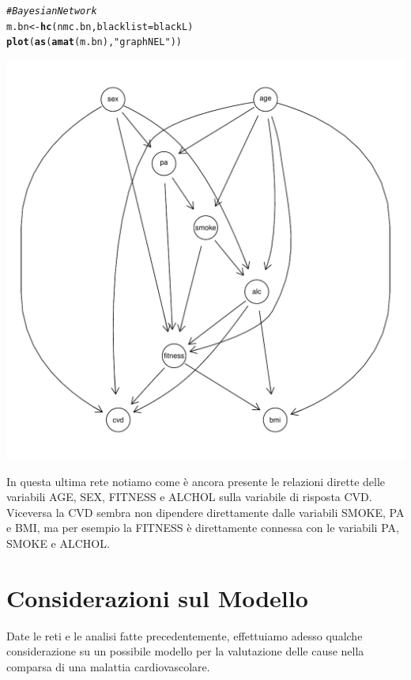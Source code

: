 \documentclass{article}\usepackage[]{graphicx}\usepackage[]{xcolor}
\makeatletter
\def\maxwidth{ %
  \ifdim\Gin@nat@width>\linewidth
    \linewidth
  \else
    \Gin@nat@width
  \fi
}
\newcommand{\hlstr}[1]{\textcolor[rgb]{0.192,0.494,0.8}{#1}}%
\newcommand{\hlcom}[1]{\textcolor[rgb]{0.678,0.584,0.686}{\textit{#1}}}%
\newcommand{\hlstd}[1]{\textcolor[rgb]{0.345,0.345,0.345}{#1}}%
\newcommand{\hlkwb}[1]{\textcolor[rgb]{0.69,0.353,0.396}{#1}}%
\newcommand{\hlkwc}[1]{\textcolor[rgb]{0.333,0.667,0.333}{#1}}%
\newcommand{\hlkwd}[1]{\textcolor[rgb]{0.737,0.353,0.396}{\textbf{#1}}}%
\newenvironment{kframe}{%
 \def\at@end@of@kframe{}%
 \ifinner\ifhmode%
  \def\at@end@of@kframe{\end{minipage}}%
  \begin{minipage}{\columnwidth}%
 \fi\fi%
 \def\FrameCommand##1{\hskip\@totalleftmargin \hskip-\fboxsep
 \colorbox{shadecolor}{##1}\hskip-\fboxsep
     \hskip-\linewidth \hskip-\@totalleftmargin \hskip\columnwidth}%
 \MakeFramed {\advance\hsize-\width
   \@totalleftmargin\z@ \linewidth\hsize
   \@setminipage}}%
 {\par\unskip\endMakeFramed%
 \at@end@of@kframe}
\newenvironment{knitrout}{}{} %
\makeatother
\begin{document}
\begin{knitrout}
\color{fgcolor}\begin{kframe}
\begin{alltt}
\hlcom{#Bayesian Network}
\hlstd{m.bn} \hlkwb{<-} \hlkwd{hc}\hlstd{(nmc.bn,} \hlkwc{blacklist}\hlstd{=blackL)}
\hlkwd{plot}\hlstd{(}\hlkwd{as}\hlstd{(}\hlkwd{amat}\hlstd{(m.bn),} \hlstr{"graphNEL"}\hlstd{))}
\end{alltt}
\end{kframe}
\includegraphics[width=\maxwidth]{figure/Bayesian_Network_finale-1} 
\end{knitrout}
    
    In questa ultima rete notiamo come è ancora presente le relazioni dirette
    delle variabili AGE, SEX, FITNESS e ALCHOL sulla variabile di risposta CVD. 
    Viceversa la CVD sembra non dipendere direttamente dalle variabili SMOKE, PA
    e BMI, ma per esempio la FITNESS è direttamente connessa con le variabili 
    PA, SMOKE e ALCHOL.
    
  \clearpage


\section{Considerazioni sul Modello}
  Date le reti e le analisi fatte precedentemente, effettuiamo adesso qualche
  considerazione su un possibile modello per la valutazione delle cause nella
  comparsa di una malattia cardiovascolare.
  
\end{document}
